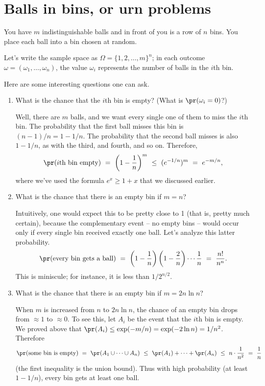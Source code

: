 \section{Balls in bins, or urn problems}

You have $m$ indistinguishable balls and in front of you is a row of
$n$ bins. You place each ball into a bin chosen at random.

Let's write the sample space as $\Omega = \{1,2,\ldots, m\}^n$; in
each outcome $\omega = (\omega_1, \ldots, \omega_n)$, the value
$\omega_i$ represents the number of balls in the $i$th bin.

Here are some interesting questions one can ask.
\begin{enumerate}
\item What is the chance that the $i$th bin is empty? (What is $\pr(\omega_i = 0)$?)

Well, there are $m$ balls, and we want every single one of them to
miss the $i$th bin. The probability that the first ball misses this
bin is $(n-1)/n = 1 - 1/n$. The probability that the second ball
misses is also $1- 1/n$, as with the third, and fourth, and so
on. Therefore,
$$ \pr(\mbox{$i$th bin empty}) 
\ = \ 
\left( 1 - \frac{1}{n} \right)^m
\ \leq \ 
(e^{-1/n})^m 
\ = \ 
e^{-m/n},
$$
where we've used the formula $e^x \geq 1+x$ that we discussed earlier.

\item What is the chance that there is an empty bin if $m = n$?

Intuitively, one would expect this to be pretty close to 1 (that is,
pretty much certain), because the complementary event -- no empty bins
-- would occur only if every single bin received exactly one
ball. Let's analyze this latter probability.
$$
\pr(\mbox{every bin gets a ball}) 
\ = \ 
\left(1 - \frac{1}{n}\right) \left( 1- \frac{2}{n}\right) \cdots \frac{1}{n} 
\ = \ 
\frac{n!}{n^n}.
$$
This is miniscule; for instance, it is less than $1/2^{n/2}$.

\item What is the chance that there is an empty bin if $m = 2n\ln n$?

When $m$ is increased from $n$ to $2n \ln n$, the chance of an empty bin drops from $\approx 1$ to $\approx 0$. To see this, let $A_i$ be the event that the $i$th bin is empty. We proved above that $\pr(A_i) \leq \exp(-m/n) = \exp(-2\ln n) = 1/n^2$. Therefore
$$
\pr(\mbox{some bin is empty}) 
\ = \ 
\pr(A_1 \cup \cdots \cup A_n) 
\ \leq \ 
\pr(A_1) + \cdots + \pr(A_n)
\ \leq \ 
n \cdot \frac{1}{n^2}
\ = \ 
\frac{1}{n}
$$
(the first inequality is the union bound). Thus with high probability (at least $1-1/n$), every bin gets at least one ball.


\end{enumerate}
